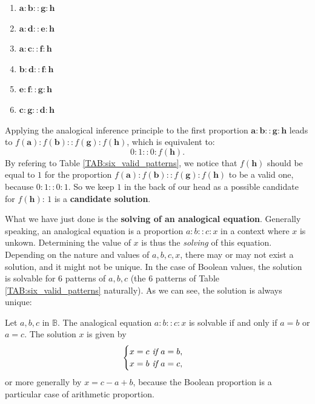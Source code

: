 \begin{enumerate}
  \item $\mathbf{a} : \mathbf{b} :: \mathbf{g} : \mathbf{h}$
  \item $\mathbf{a} : \mathbf{d} :: \mathbf{e} : \mathbf{h}$
  \item $\mathbf{a} : \mathbf{c} :: \mathbf{f} : \mathbf{h}$
  \item $\mathbf{b} : \mathbf{d} :: \mathbf{f} : \mathbf{h}$
  \item $\mathbf{e} : \mathbf{f} :: \mathbf{g} : \mathbf{h}$
  \item $\mathbf{c} : \mathbf{g} :: \mathbf{d} : \mathbf{h}$
\end{enumerate}

Applying the analogical inference principle to the first proportion $\mathbf{a}
: \mathbf{b} :: \mathbf{g} : \mathbf{h}$ leads to $f(\mathbf{a}) :
f(\mathbf{b}) :: f(\mathbf{g}) : f(\mathbf{h})$, which is equivalent to:
$$0:1::0:f(\mathbf{h}).$$ By refering to Table \ref{TAB:six_valid_patterns}, we
notice that $f(\mathbf{h})$ should be equal to $1$ for the proportion
$f(\mathbf{a}) : f(\mathbf{b}) :: f(\mathbf{g}) : f(\mathbf{h})$ to be a valid
one, because $0:1::0:1$. So we keep $1$ in the back of our head as a possible
candidate for $f(\mathbf{h})$: $1$ is a \textbf{candidate solution}.

What we have just done is the \textbf{solving of an analogical equation}.
Generally speaking, an analogical equation is a proportion $a:b::c:x$ in a
context where $x$ is unkown. Determining the value of $x$ is thus the
\textit{solving} of this equation. Depending on the nature and values of $a, b,
c, x$, there may or may not exist a solution, and it might not be unique. In
the case of Boolean values, the solution is solvable for 6 patterns of $a, b,
c$ (the 6 patterns of Table \ref{TAB:six_valid_patterns} naturally). As we can
see, the solution is always unique:

\begin{proposition}
  Let $a, b, c$ in $\mathbb{B}$. The analogical equation
  $a :b::c:x$
  is solvable if and only if $a = b$ or $a = c$. The solution $x$ is given by
  $$
  \begin{cases}
    x = c \emph{ if } a = b,\\
    x = b \emph{ if } a = c,
  \end{cases}
  $$
  or more generally by $x = c - a + b$, because the Boolean proportion is a
  particular case of arithmetic proportion.
\end{proposition}

